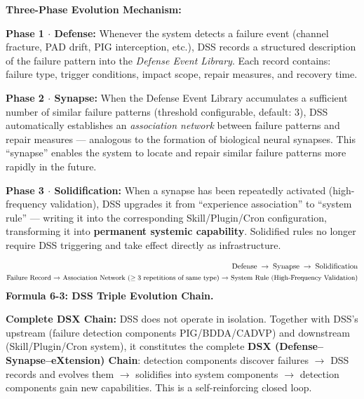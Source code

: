 \documentclass[11pt,a4paper]{article}
\begin{document}
\smallskip
\noindent\textbf{Three-Phase Evolution Mechanism:}

\smallskip
\noindent\textbf{Phase 1 $\cdot$ Defense:} Whenever the system detects a failure event (channel fracture, PAD drift, PIG interception, etc.), DSS records a structured description of the failure pattern into the \emph{Defense Event Library}. Each record contains: failure type, trigger conditions, impact scope, repair measures, and recovery time.

\noindent\textbf{Phase 2 $\cdot$ Synapse:} When the Defense Event Library accumulates a sufficient number of similar failure patterns (threshold configurable, default: 3), DSS automatically establishes an \emph{association network} between failure patterns and repair measures --- analogous to the formation of biological neural synapses. This ``synapse'' enables the system to locate and repair similar failure patterns more rapidly in the future.

\noindent\textbf{Phase 3 $\cdot$ Solidification:} When a synapse has been repeatedly activated (high-frequency validation), DSS upgrades it from ``experience association'' to ``system rule'' --- writing it into the corresponding Skill/Plugin/Cron configuration, transforming it into \textbf{permanent systemic capability}. Solidified rules no longer require DSS triggering and take effect directly as infrastructure.

\begin{equation}\label{eq:dss-triple}
\begin{aligned}
\text{Defense} \;\rightarrow\; \text{Synapse} \;\rightarrow\; \text{Solidification} \\
\text{\small Failure Record $\rightarrow$ Association Network ($\geq 3$ repetitions of same type) $\rightarrow$ System Rule (High-Frequency Validation)}
\end{aligned}
\end{equation}
\smallskip
\noindent\textbf{Formula 6-3: DSS Triple Evolution Chain.}

\textbf{Complete DSX Chain:} DSS does not operate in isolation. Together with DSS's upstream (failure detection components PIG/BDDA/CADVP) and downstream (Skill/Plugin/Cron system), it constitutes the complete \textbf{DSX (Defense--Synapse--eXtension) Chain}: detection components discover failures $\rightarrow$ DSS records and evolves them $\rightarrow$ solidifies into system components $\rightarrow$ detection components gain new capabilities. This is a self-reinforcing closed loop.
\end{document}
